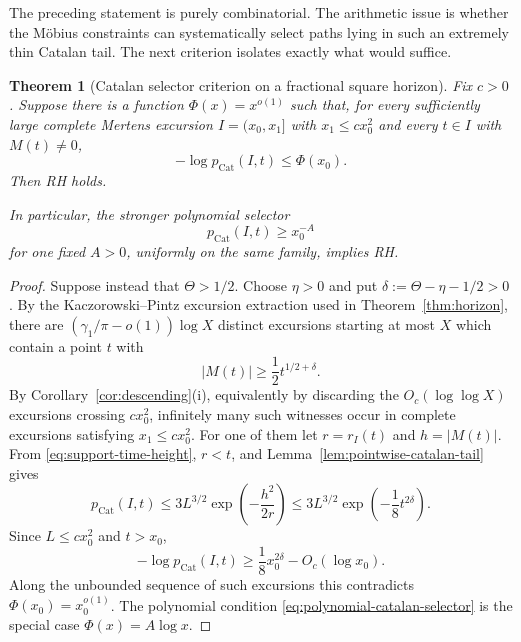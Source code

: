 \documentclass[11pt]{amsart}
\numberwithin{equation}{section}
\theoremstyle{plain}
\newtheorem{theorem}{Theorem}[section]
\theoremstyle{definition}
\theoremstyle{remark}
\begin{document}
The preceding statement is purely combinatorial.  The arithmetic issue is
whether the M\"obius constraints can systematically select paths lying in
such an extremely thin Catalan tail.  The next criterion isolates exactly
what would suffice.

\begin{theorem}[Catalan selector criterion on a fractional square horizon]
\label{thm:catalan-selector-square}
Fix $c>0$.  Suppose there is a function $\Phi(x)=x^{o(1)}$ such that, for
every sufficiently large complete Mertens excursion $I=(x_0,x_1]$ with
$x_1\le cx_0^2$ and every $t\in I$ with $M(t)\ne0$,
\begin{equation}
\label{eq:subpower-catalan-selector}
 -\log p_{\mathrm{Cat}}(I,t)\le\Phi(x_0).
\end{equation}
Then RH holds.

In particular, the stronger polynomial selector
\begin{equation}
\label{eq:polynomial-catalan-selector}
 p_{\mathrm{Cat}}(I,t)\ge x_0^{-A}
\end{equation}
for one fixed $A>0$, uniformly on the same family, implies RH.
\end{theorem}

\begin{proof}
Suppose instead that $\Theta>1/2$.  Choose $\eta>0$ and put
$\delta:=\Theta-\eta-1/2>0$.  By the Kaczorowski--Pintz excursion
extraction used in Theorem~\ref{thm:horizon}, there are
$(\gamma_1/\pi-o(1))\log X$ distinct excursions starting at most $X$ which
contain a point $t$ with
\[
 |M(t)|\ge\frac12t^{1/2+\delta}.
\]
By Corollary~\ref{cor:descending}(i), equivalently by discarding the
$O_c(\log\log X)$ excursions crossing $cx_0^2$, infinitely many such
witnesses occur in complete excursions satisfying $x_1\le cx_0^2$.
For one of them let $r=r_I(t)$ and $h=|M(t)|$.  From
\eqref{eq:support-time-height}, $r<t$, and
Lemma~\ref{lem:pointwise-catalan-tail} gives
\[
 p_{\mathrm{Cat}}(I,t)
 \le3L^{3/2}\exp\!\left(-\frac{h^2}{2r}\right)
 \le3L^{3/2}\exp\!\left(-\frac18t^{2\delta}\right).
\]
Since $L\le cx_0^2$ and $t>x_0$,
\begin{equation}
\label{eq:KP-catalan-surprise}
 -\log p_{\mathrm{Cat}}(I,t)
 \ge\frac18x_0^{2\delta}-O_c(\log x_0).
\end{equation}
Along the unbounded sequence of such excursions this contradicts
$\Phi(x_0)=x_0^{o(1)}$.  The polynomial condition
\eqref{eq:polynomial-catalan-selector} is the special case
$\Phi(x)=A\log x$.
\end{proof}
\end{document}
